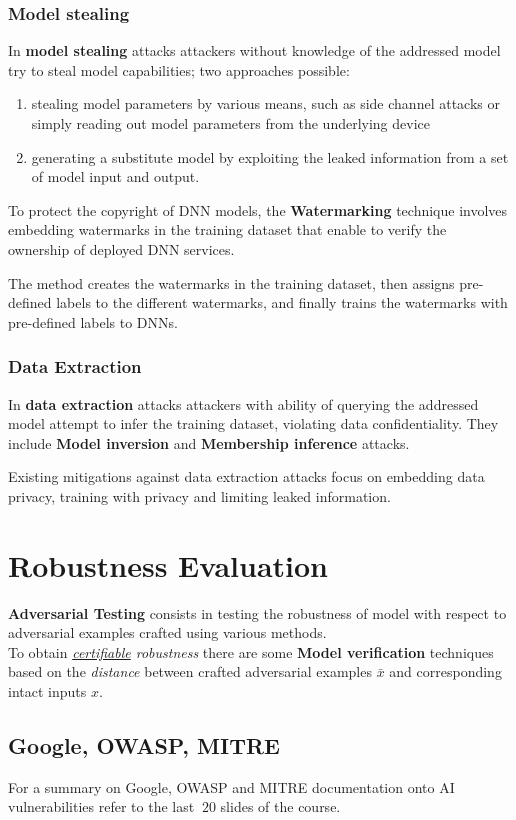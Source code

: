 \subsubsection{Model stealing}
In \textbf{model stealing} attacks attackers without knowledge of the addressed model
try to steal model capabilities; 
two approaches possible:
\begin{enumerate}
   \item stealing model parameters by various means, such as side channel attacks or simply reading out model parameters from the underlying device
   \item generating a substitute model by exploiting the leaked information from a set of model input and output.
\end{enumerate}

To protect the copyright of DNN models, the \textbf{Watermarking} technique involves embedding watermarks in the training dataset that enable to verify the ownership of deployed DNN services.

The method creates the watermarks in the training dataset, then assigns pre-defined labels to the different watermarks, and finally trains the watermarks with
pre-defined labels to DNNs.

\subsubsection{Data Extraction}
In \textbf{data extraction} attacks attackers with ability of querying the
addressed model attempt to infer the training dataset, violating data confidentiality.
They include \textbf{Model inversion} and \textbf{Membership inference} attacks.

Existing mitigations against data extraction attacks focus on embedding data
privacy, training with privacy and limiting leaked information.

\section{Robustness Evaluation}
\textbf{Adversarial Testing} consists in testing the robustness of model with respect to adversarial examples crafted using various methods.\\
To obtain \textit{\underline{certifiable} robustness} there are some \textbf{Model verification} techniques based on the \textit{distance} between crafted adversarial examples $\bar{x}$ and corresponding intact inputs $x$.

\subsection{Google, OWASP, MITRE}

For a summary on Google, OWASP and MITRE documentation onto AI vulnerabilities refer to the last $~20$ slides of the course. 
